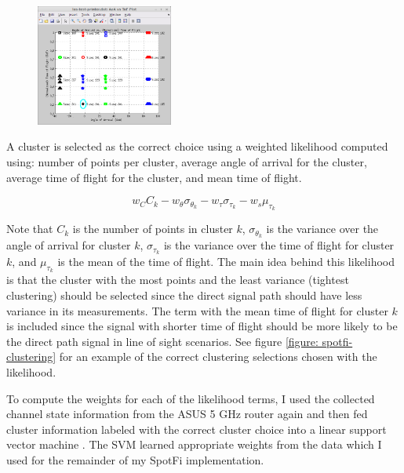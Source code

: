 \documentclass[12pt]{report}
\begin{document}
\begin{figure}[!htb]
\begin{center}
        \includegraphics[width=0.4\textwidth]{../images/clustering-printer.png}
    \end{center}
\end{figure}

A cluster is selected as the correct choice using a weighted likelihood computed using: number of points per cluster, average angle of arrival for the cluster, average time of flight for the cluster, and mean time of flight. 

$$w_{C} C_k - w_{\theta} \sigma_{\theta_{k}} - w_{\tau} \sigma_{\tau_{k}} - w_{s} \mu_{\tau_{k}}$$

Note that $C_k$ is the number of points in cluster $k$, $\sigma_{\theta_{k}}$ is the variance over the angle of arrival for cluster $k$, $\sigma_{\tau_{k}}$ is the variance over the time of flight for cluster $k$, and $\mu_{\tau_{k}}$ is the mean of the time of flight. The main idea behind this likelihood is that the cluster with the most points and the least variance (tightest clustering) should be selected since the direct signal path should have less variance in its measurements. The term with the mean time of flight for cluster $k$ is included since the signal with shorter time of flight should be more likely to be the direct path signal in line of sight scenarios. See figure \ref{figure: spotfi-clustering} for an example of the correct clustering selections chosen with the likelihood. \par

To compute the weights for each of the likelihood terms, I used the collected channel state information from the ASUS 5 GHz router again and then fed cluster information labeled with the correct cluster choice into a linear support vector machine \cite{SvmTutorialBurges1998}. The SVM learned appropriate weights from the data which I used for the remainder of my SpotFi implementation. \par

\end{document}
